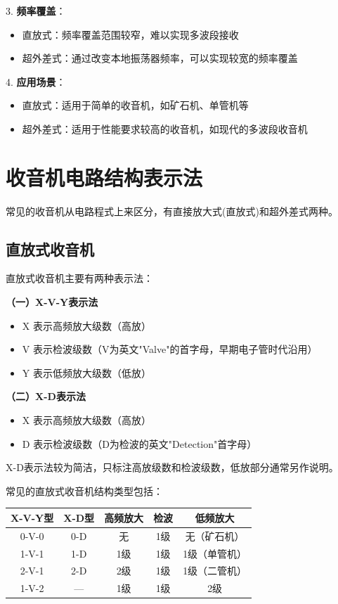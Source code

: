 \documentclass[12pt,UTF8]{ctexbook}
\begin{document}
3. \textbf{频率覆盖}：
   \begin{itemize}[leftmargin=3.5em]
   \item 直放式：频率覆盖范围较窄，难以实现多波段接收
   \item 超外差式：通过改变本地振荡器频率，可以实现较宽的频率覆盖
   \end{itemize}

4. \textbf{应用场景}：
   \begin{itemize}[leftmargin=3.5em]
   \item 直放式：适用于简单的收音机，如矿石机、单管机等
   \item 超外差式：适用于性能要求较高的收音机，如现代的多波段收音机
   \end{itemize}

\section{收音机电路结构表示法}

常见的收音机从电路程式上来区分，有直接放大式(直放式)和超外差式两种。

\subsection{直放式收音机}

直放式收音机主要有两种表示法：

\textbf{（一）X-V-Y表示法}

\begin{itemize}[leftmargin=3.5em]
	\item X 表示高频放大级数（高放）
	\item V 表示检波级数（V为英文"Valve"的首字母，早期电子管时代沿用）
	\item Y 表示低频放大级数（低放）
\end{itemize}

\textbf{（二）X-D表示法}

\begin{itemize}[leftmargin=3.5em]
	\item X 表示高频放大级数（高放）
	\item D 表示检波级数（D为检波的英文"Detection"首字母）
\end{itemize}

X-D表示法较为简洁，只标注高放级数和检波级数，低放部分通常另作说明。

常见的直放式收音机结构类型包括：

\begin{center}
	\begin{tabular}{|c|c|c|c|c|}
		\hline
		\textbf{X-V-Y型} & \textbf{X-D型} & \textbf{高频放大} & \textbf{检波} & \textbf{低频放大} \\
		\hline
		0-V-0 & 0-D & 无 & 1级 & 无（矿石机） \\
		\hline
		1-V-1 & 1-D & 1级 & 1级 & 1级（单管机） \\
		\hline
		2-V-1 & 2-D & 2级 & 1级 & 1级（二管机） \\
		\hline
		1-V-2 & — & 1级 & 1级 & 2级 \\
		\hline
	\end{tabular}
\end{center}
\end{document}
